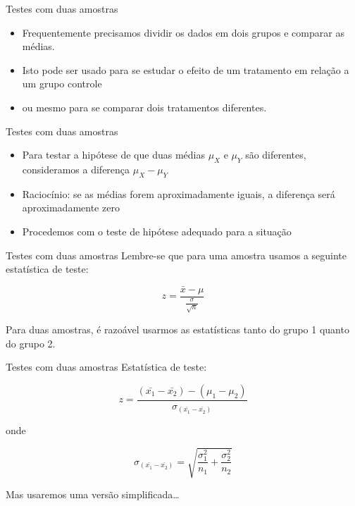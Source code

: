 \documentclass{beamer}
\begin{document}
\begin{frame}{Testes com duas amostras}
  \begin{itemize}
  \item Frequentemente precisamos dividir os dados em dois grupos e
    comparar as médias.
  \item Isto pode ser usado para se estudar o efeito de um tratamento
    em relação a um grupo controle
  \item ou mesmo para se comparar dois tratamentos diferentes.    
  \end{itemize}
\end{frame}

\begin{frame}{Testes com duas amostras}
  \begin{itemize}
  \item Para testar a hipótese de que duas médias $\mu_X$ e $\mu_Y$
    são diferentes, consideramos a diferença $\mu_X - \mu_Y$
  \item Raciocínio: se as médias forem aproximadamente iguais, a
    diferença será aproximadamente zero
  \item Procedemos com o teste de hipótese adequado para a situação
  \end{itemize}
\end{frame}

\begin{frame}{Testes com duas amostras}
Lembre-se que para uma amostra usamos a seguinte estatística de teste:

\begin{displaymath}
  z = \frac{\bar{x} - \mu}{\frac{\sigma}{\sqrt{n}}}
\end{displaymath}

Para duas amostras, é razoável usarmos as estatísticas tanto do grupo
1 quanto do grupo 2.
\end{frame}

\begin{frame}{Testes com duas amostras}
Estatística de teste:

\begin{displaymath}
  z = \frac{ (\bar{x_1} - \bar{x_2}) - (\mu_1 - \mu_2)
  }{\sigma_{(\bar{x_1} - \bar{x_2})}}
\end{displaymath}

onde 

\begin{displaymath}
  \sigma_{(\bar{x_1} - \bar{x_2})} = \sqrt{\frac{\sigma_1^2}{n_1} + \frac{\sigma^2_2}{n_2}}
\end{displaymath}

Mas usaremos uma versão simplificada\ldots
\end{frame}
\end{document}
